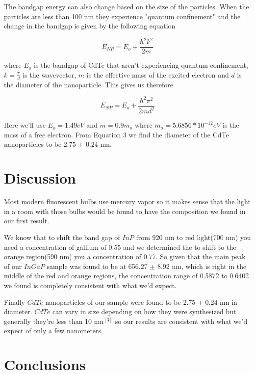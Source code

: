 \documentclass{article}
\begin{document}
The bandgap energy can also change based on the size of the particles.  When the particles are less than 100 nm they experience "quantum confinement" and the change in the bandgap is given by the following equation

\begin{equation}
    E_{NP}=E_o+\frac{\hbar^2k^2}{2m}
\end{equation}

where $E_o$ is the bandgap of CdTe that aren't experiencing quantum confinement, $k=\frac{\pi}{d}$ is the wavevector, $m$ is the effective mass of the excited electron and $d$ is the diameter of the nanoparticle.  This gives us therefore

\begin{equation}
    E_{NP}=E_o+\frac{\hbar^2\pi^2}{2md^2}
\end{equation}

Here we'll use $E_o=1.49 eV$ and $m=0.9m_o$ where $m_o=5.6856*10^{-12} eV$ is the mass of a free electron.  From Equation 3 we find the diameter of the CdTe nanoparticles to be 2.75 $\pm$ 0.24 nm.

\section{Discussion}

Most modern fluorescent bulbs use mercury vapor so it makes sense that the light in a room with those bulbs would be found to have the composition we found in our first result.

We know that to shift the band gap of $InP$ from 920 nm to red light(700 nm) you need a concentration of gallium of 0.55 and we determined the to shift to the orange region(590 nm) you a concentration of 0.77.  So given that the main peak of our $InGaP$ sample was found to be at 656.27 $\pm$ 8.92 nm, which is right in the middle of the red and orange regions, the concentration range of 0.5872 to 0.6402 we found is completely consistent with what we'd expect.

Finally $CdTe$ nanoparticles of our sample were found to be 2.75 $\pm$ 0.24 nm in diameter.  $CdTe$ can vary in size depending on how they were synthesized but generally they're less than 10 nm$^{[3]}$ so our results are consistent with what we'd expect of only a few nanometers.

\section{Conclusions}
\end{document}
